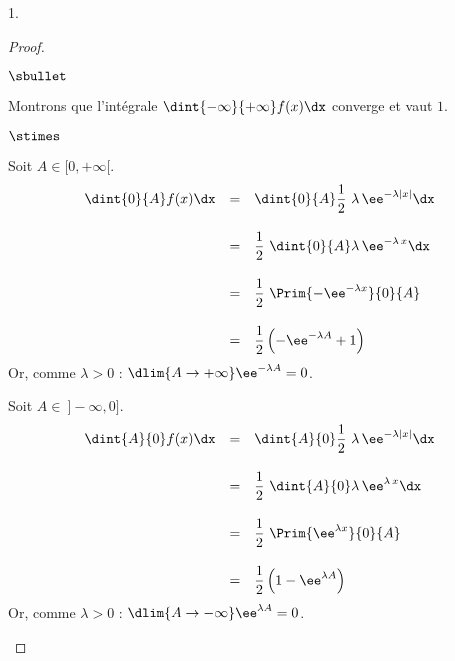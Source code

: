 \documentclass[11pt]{article}%
\begin{document}
\begin{noliste}{1.}
\begin{proof}
\begin{noliste}{$\sbullet$}
      \newpage
      
      
    \item Montrons que l'intégrale $\dint{-\infty}{+\infty} f(x) \dx$
      converge et vaut $1$.
      \begin{noliste}{$\stimes$}
      \item Soit $A \in [0, +\infty[$.
        \[
          \begin{array}{rcl}
            \dint{0}{A} f(x) \dx
            & = & \dint{0}{A} \dfrac{1}{2} \ \lambda \, \ee^{- \lambda
                  | x |} \dx
            \\[.6cm]
            & = & \dfrac{1}{2} \ \dint{0}{A} \lambda \, \ee^{- \lambda
                  \, x} \dx
            \\[.6cm]
            & = & \dfrac{1}{2} \ \Prim{- \ee^{-\lambda x}}{0}{A}
            \\[.6cm]
            & = & \dfrac{1}{2} \left(-\ee^{-\lambda A} + 1\right)
          \end{array}
        \]
        Or, comme $\lambda >0$ : $\dlim{A \to +\infty} \ee^{- \lambda
          A} = 0$.
        
      \item Soit $A \in \ ]-\infty, 0]$.
        \[
          \begin{array}{rcl}
            \dint{A}{0} f(x) \dx
            & = & \dint{A}{0} \dfrac{1}{2} \ \lambda \, \ee^{- \lambda
                  | x |} \dx
            \\[.6cm]
            & = & \dfrac{1}{2} \ \dint{A}{0} \lambda \, \ee^{ \lambda
                  \, x} \dx
            \\[.6cm]
            & = & \dfrac{1}{2} \ \Prim{\ee^{\lambda x}}{0}{A}
            \\[.6cm]
            & = & \dfrac{1}{2} \left(1 - \ee^{\lambda A}\right)
          \end{array}
        \]
        Or, comme $\lambda >0$ : $\dlim{A \to -\infty} \ee^{\lambda
          A} = 0$.
        

\end{noliste}
\end{noliste}
\end{proof}
\end{noliste}
\end{document}
